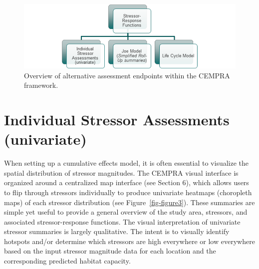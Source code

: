 \documentclass[
  letterpaper,
  DIV=11,
  numbers=noendperiod]{scrreprt}
\begin{document}
\begin{figure}

{\centering \includegraphics{images/image006.png}

}

\caption{\label{fig-figure2}Overview of alternative assessment endpoints
within the CEMPRA framework.}

\end{figure}

\hypertarget{individual-stressor-assessments-univariate}{%
\section{Individual Stressor Assessments
(univariate)}\label{individual-stressor-assessments-univariate}}

When setting up a cumulative effects model, it is often essential to
visualize the spatial distribution of stressor magnitudes. The CEMPRA
visual interface is organized around a centralized map interface (see
Section 6), which allows users to flip through stressors individually to
produce univariate heatmaps (choropleth maps) of each stressor
distribution (see Figure~\ref{fig-figure3}). These summaries are simple
yet useful to provide a general overview of the study area, stressors,
and associated stressor-response functions. The visual interpretation of
univariate stressor summaries is largely qualitative. The intent is to
visually identify hotspots and/or determine which stressors are high
everywhere or low everywhere based on the input stressor magnitude data
for each location and the corresponding predicted habitat capacity.
\end{document}
